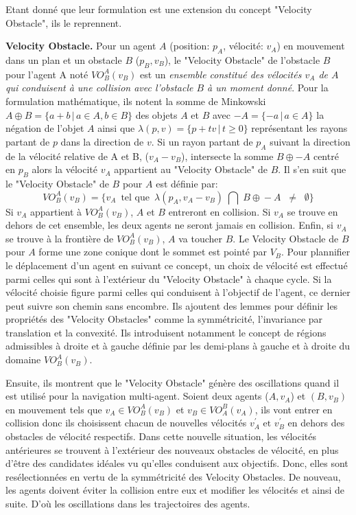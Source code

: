 \documentclass[11pt]{article}
\begin{document}
Etant donné que leur formulation est une extension du concept "Velocity Obstacle", ils le reprennent. 

\textbf{Velocity Obstacle.} Pour un agent $A$ (position: $p_A$, vélocité: $v_A$) en mouvement dans un plan et un obstacle $B$ ($p_B, v_B$), le "Velocity Obstacle" de l'obstacle $B$ pour l'agent A noté \textbf{$VO_B^A(v_B)$} est un \textit{ensemble constitué des vélocités $v_A$ de $A$ qui conduisent à une collision avec l'obstacle $B$ à un moment donné}. Pour la formulation mathématique, ils notent la somme de Minkowski $A \oplus B = \{a+b \,|\, a \in A, b \in B\}$ des objets $A$ et $B$ avec $-A = \{-a \,|\, a \in A \}$ la négation de l'objet $A$ ainsi que $\lambda(p,v) = \{ p + tv \,|\, t \geq 0 \}$ représentant les rayons partant de $p$ dans la direction de $v$. Si un rayon partant de $p_A$ suivant la direction de la vélocité relative de A et B, ($v_A - v_B$), intersecte la somme $B \oplus -A$ centré en $p_B$ alors la vélocité $v_A$ appartient au "Velocity Obstacle" de $B$. Il s'en suit que le "Velocity Obstacle" de $B$ pour $A$ est définie par: 
\[
VO_B^A(v_B) = \{ v_A \,\mbox{ tel que }\, \lambda(p_A, v_A - v_B)\; \bigcap \; B \oplus\! -A \; \; \neq\; \;  \emptyset \}
\] 
Si $v_A$ appartient à $VO_B^A(v_B)$, $A$ et $B$ entreront en collision. Si $v_A$ se trouve en dehors de cet ensemble,  les deux agents ne seront jamais en collision. Enfin, si $v_A$ se trouve à la frontière de $VO_B^A(v_B)$, $A$ va toucher $B$. Le Velocity Obstacle de $B$ pour $A$ forme une zone conique dont le sommet est pointé par $V_B$. Pour plannifier le déplacement d'un agent en suivant ce concept, un choix de vélocité est effectué parmi celles qui sont à l'extérieur du "Velocity Obstacle" à chaque cycle. Si la vélocité choisie figure parmi celles qui conduisent à l'objectif de l'agent, ce dernier peut suivre son chemin sans encombre. Ils ajoutent des lemmes pour définir les propriétés des "Velocity Obstacles" comme la symmétricité, l'invariance par translation et la convexité. Ils introduisent notamment le concept de régions admissibles à droite et à gauche définie par les demi-plans à gauche et à droite du domaine $VO_B^A(v_B)$.

Ensuite, ils montrent que le "Velocity Obstacle" génère des oscillations quand il est utilisé pour la navigation multi-agent. Soient deux agents ($A, v_A$)  et $(B, v_B)$ en mouvement tels que $v_A \in VO_B^A(v_B)$ et $v_B \in VO_A^B(v_A)$, ils vont entrer en collision donc ils choisissent chacun de nouvelles vélocités $v_A^\prime \mbox{ et } v_B^\prime$ en dehors des obstacles de vélocité respectifs. Dans cette nouvelle situation, les vélocités antérieures se trouvent à l'extérieur des nouveaux obstacles de vélocité, en plus d'être des candidates idéales vu qu'elles conduisent aux objectifs. Donc, elles sont resélectionnées en vertu de la symmétricité des Velocity Obstacles. De nouveau, les agents doivent éviter la collision entre eux et modifier les vélocités et ainsi de suite. D'où les oscillations dans les trajectoires des agents.
\end{document}
